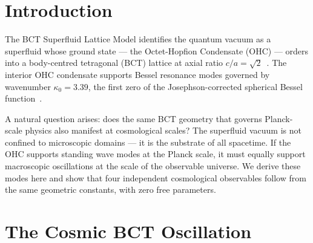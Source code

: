 \documentclass[aps,prl,twocolumn,showpacs,superscriptaddress]{revtex4-2}
\begin{document}
\begin{abstract}
We demonstrate that the BCT superfluid vacuum supports a macroscopic standing 
wave oscillation at the scale of the observable universe. The fundamental mode 
frequency, set by the OHC Bessel wavenumber $\kappa_0 = 3.39$ and the Hubble 
radius, yields a cosmic oscillation period $T_{\mathcal{U}} = 86.2~\text{Gyr} 
= 5.96\,t_H$. The universe is currently at phase $60^\circ$ --- the early 
exhale of its first oscillation. The tetrahedral void ratio $r_{\rm tet}/\pi$, 
the same geometric factor governing Planck-scale void structure, predicts the 
large-scale peculiar velocity $v_{\rm pec} = 605~\text{km/s}$ (observed 
$\sim 600~\text{km/s}$, error $+0.85\%$) and the standing wave node distance 
$r_{\rm node} = 510~\text{Mpc}$, consistent with the Shapley--Great Attractor 
complex. The constant $\kappa_0 = 3.39$ spans 61 orders of magnitude from the 
Planck scale to the cosmic horizon.
\end{abstract}

\maketitle

\section{Introduction}

The BCT Superfluid Lattice Model identifies the quantum vacuum as a superfluid 
whose ground state --- the Octet-Hopfion Condensate (OHC) --- orders into a 
body-centred tetragonal (BCT) lattice at axial ratio $c/a = \sqrt{2}$~\cite{L1}. 
The interior OHC condensate supports Bessel resonance modes governed by 
wavenumber $\kappa_0 = 3.39$, the first zero of the Josephson-corrected 
spherical Bessel function~\cite{AppJH}.

A natural question arises: does the same BCT geometry that governs Planck-scale 
physics also manifest at cosmological scales? The superfluid vacuum is not 
confined to microscopic domains --- it is the substrate of all spacetime. If 
the OHC supports standing wave modes at the Planck scale, it must equally 
support macroscopic oscillations at the scale of the observable universe. We 
derive these modes here and show that four independent cosmological observables 
follow from the same geometric constants, with zero free parameters.

\section{The Cosmic BCT Oscillation}
\end{document}
